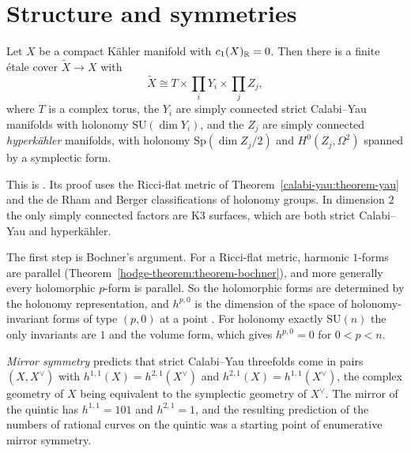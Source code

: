 \section{Structure and symmetries}\label{calabi-yau:section-structure}

\begin{theorem}\label{calabi-yau:theorem-beauville-bogomolov}
Let $X$ be a compact K\"ahler manifold with $c_1(X)_{\mathbb{R}} = 0$. Then there is a finite \'etale cover $\tilde X \to X$ with
\[
\tilde X \cong T \times \prod_iY_i \times \prod_jZ_j,
\]
where $T$ is a complex torus, the $Y_i$ are simply connected strict Calabi--Yau manifolds with holonomy $\mathrm{SU}(\dim Y_i)$, and the $Z_j$ are simply connected
\emph{hyperk\"ahler} manifolds, with holonomy $\mathrm{Sp}(\dim Z_j/2)$ and $H^0(Z_j, \Omega^2)$ spanned by a symplectic form.
\end{theorem}

This is \cite{beauville-1983}. Its proof uses the Ricci-flat metric of Theorem~\ref{calabi-yau:theorem-yau} and the de Rham and Berger classifications of holonomy
groups. In dimension $2$ the only simply connected factors are K3 surfaces, which are both strict Calabi--Yau and hyperk\"ahler.

\begin{remark}\label{calabi-yau:remark-bochner}
The first step is Bochner's argument. For a Ricci-flat metric, harmonic $1$-forms are parallel (Theorem~\ref{hodge-theorem:theorem-bochner}), and more generally every holomorphic
$p$-form is parallel. So the holomorphic forms are determined by the holonomy representation, and $h^{p,0}$ is the dimension of the space of holonomy-invariant forms of type
$(p, 0)$ at a point \cite{gross-huybrechts-joyce}. For holonomy exactly $\mathrm{SU}(n)$ the only invariants are $1$ and the volume form, which gives $h^{p,0} = 0$ for $0 < p < n$.
\end{remark}

\begin{remark}\label{calabi-yau:remark-mirror-symmetry}
\emph{Mirror symmetry} predicts that strict Calabi--Yau threefolds come in pairs $(X, X^\vee)$ with $h^{1,1}(X) = h^{2,1}(X^\vee)$ and $h^{2,1}(X) = h^{1,1}(X^\vee)$, the
complex geometry of $X$ being equivalent to the symplectic geometry of $X^\vee$. The mirror of the quintic has $h^{1,1} = 101$ and $h^{2,1} = 1$, and the resulting prediction of the
numbers of rational curves on the quintic \cite{candelas-1991} was a starting point of enumerative mirror symmetry.
\end{remark}

